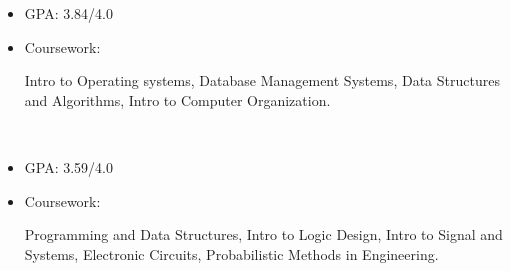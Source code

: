\newcommand{\TUBentry}{
    \TUB
    \poswithprd{Introduction to 3D Scanning and Printing at TUB Winter University}{Jan 2018-Feb 2018}
    \begin{itemize}
        \item 
        Learned the basic of 3D scanning \& printing. Learned Blender for 3D modeling.
    \end{itemize}
}



\UM
{}
\begin{itemize}
    \item GPA: 3.84/4.0
    \item Coursework: 
    \begin{minipage}[t]{\courseworkwidth}
        Intro to Operating systems,
        Database Management Systems,
        Data Structures and Algorithms,
        Intro to Computer Organization.
    \end{minipage}\\
\end{itemize}

\JI
{}
\begin{itemize}
    \item GPA: 3.59/4.0
    \item Coursework:
    \begin{minipage}[t]{\courseworkwidth}
        Programming and Data Structures,
        Intro to Logic Design,
        Intro to Signal and Systems,
        Electronic Circuits,
        Probabilistic Methods in Engineering.
    \end{minipage}\\
\end{itemize}